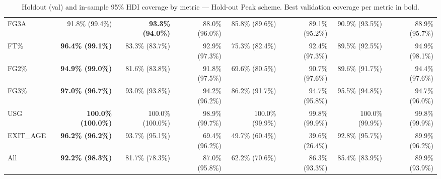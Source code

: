 \documentclass{article}
\begin{document}
\begin{table}[H]
{\begin{tabular}{lrrrrrrr}
FG3A & 91.8\% (99.4\%) & \textbf{93.3\% (94.0\%)} & 88.0\% (96.0\%) & 85.8\% (89.6\%) & 89.1\% (95.2\%) & 90.9\% (93.5\%) & 88.9\% (95.7\%) \\
FT\% & \textbf{96.4\% (99.1\%)} & 83.3\% (83.7\%) & 92.9\% (97.3\%) & 75.3\% (82.4\%) & 92.4\% (97.3\%) & 89.5\% (92.5\%) & 94.9\% (98.1\%) \\
FG2\% & \textbf{94.9\% (99.0\%)} & 81.6\% (83.8\%) & 91.8\% (97.5\%) & 69.6\% (80.5\%) & 90.7\% (97.6\%) & 89.6\% (91.7\%) & 94.4\% (97.6\%) \\
FG3\% & \textbf{97.0\% (96.7\%)} & 93.0\% (93.8\%) & 94.2\% (96.2\%) & 86.2\% (91.7\%) & 94.7\% (95.8\%) & 95.5\% (94.8\%) & 94.7\% (96.0\%) \\
USG & \textbf{100.0\% (100.0\%)} & 100.0\% (100.0\%) & 98.9\% (99.7\%) & 100.0\% (99.9\%) & 99.8\% (99.9\%) & 100.0\% (99.9\%) & 99.8\% (99.9\%) \\
EXIT\_AGE & \textbf{96.2\% (96.2\%)} & 93.7\% (95.1\%) & 69.4\% (96.2\%) & 49.7\% (60.4\%) & 39.6\% (26.4\%) & 92.8\% (95.7\%) & 89.9\% (96.2\%) \\
\midrule
All & \textbf{92.2\% (98.3\%)} & 81.7\% (78.3\%) & 87.0\% (95.8\%) & 62.2\% (70.6\%) & 86.3\% (93.3\%) & 85.4\% (83.9\%) & 89.9\% (93.9\%) \\
\bottomrule
\end{tabular}
}
\caption{Holdout (val) and in-sample 95\% HDI coverage by metric --- Hold-out Peak scheme. Best validation coverage per metric in bold.}
\label{tab:hdi_coverage_holdout_peak}
\end{table}
\end{document}
